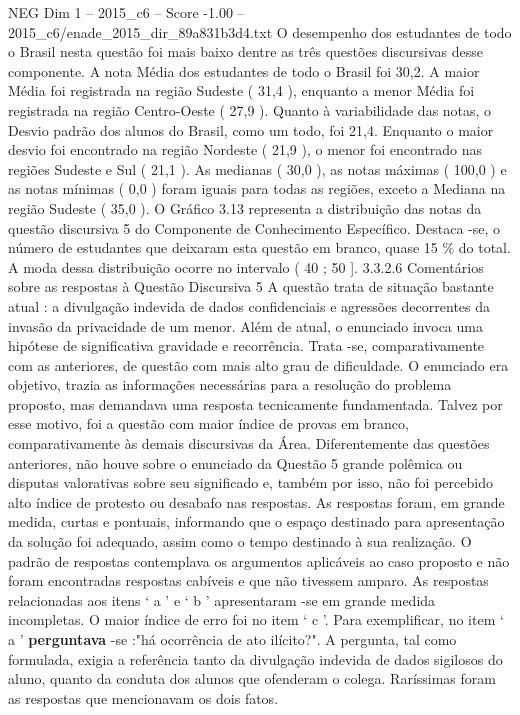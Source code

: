 \begin{textsample}{NEG Dim 1 – 2015\_c6 – Score -1.00 – 2015\_c6/enade\_2015\_dir\_89a831b3d4.txt}
O desempenho dos estudantes de todo o Brasil nesta questão foi mais baixo dentre as três questões discursivas desse componente.
A nota Média dos estudantes de todo o Brasil foi 30,2.
A maior Média foi registrada na região Sudeste ( 31,4 ), enquanto a menor Média foi registrada na região Centro-Oeste ( 27,9 ).
Quanto à variabilidade das notas, o Desvio padrão dos alunos do Brasil, como um todo, foi 21,4.
Enquanto o maior desvio foi encontrado na região Nordeste ( 21,9 ), o menor foi encontrado nas regiões Sudeste e Sul ( 21,1 ).
As medianas ( 30,0 ), as notas máximas ( 100,0 ) e as notas mínimas ( 0,0 ) foram iguais para todas as regiões, exceto a Mediana na região Sudeste ( 35,0 ).
O Gráfico 3.13 representa a distribuição das notas da questão discursiva 5 do Componente de Conhecimento Específico.
Destaca -se, o número de estudantes que deixaram esta questão em branco, quase 15 \% do total.
A moda dessa distribuição ocorre no intervalo ( 40 ; 50 ]. 3.3.2.6 Comentários sobre as respostas à Questão Discursiva 5 A questão trata de situação bastante atual : a divulgação indevida de dados confidenciais e agressões decorrentes da invasão da privacidade de um menor.
Além de atual, o enunciado invoca uma hipótese de significativa gravidade e recorrência.
Trata -se, comparativamente com as anteriores, de questão com mais alto grau de dificuldade.
O enunciado era objetivo, trazia as informações necessárias para a resolução do problema proposto, mas demandava uma resposta tecnicamente fundamentada.
Talvez por esse motivo, foi a questão com maior índice de provas em branco, comparativamente às demais discursivas da Área.
Diferentemente das questões anteriores, não houve sobre o enunciado da Questão 5 grande polêmica ou disputas valorativas sobre seu significado e, também por isso, não foi percebido alto índice de protesto ou desabafo nas respostas.
As respostas foram, em grande medida, curtas e pontuais, informando que o espaço destinado para apresentação da solução foi adequado, assim como o tempo destinado à sua realização.
O padrão de respostas contemplava os argumentos aplicáveis ao caso proposto e não foram encontradas respostas cabíveis e que não tivessem amparo.
As respostas relacionadas aos itens ‘ a ’ e ‘ b ’ apresentaram -se em grande medida incompletas.
O maior índice de erro foi no item ‘ c ’.
Para exemplificar, no item ‘ a ’ \textbf{perguntava} -se :"há ocorrência de ato ilícito?".
A pergunta, tal como formulada, exigia a referência tanto da divulgação indevida de dados sigilosos do aluno, quanto da conduta dos alunos que ofenderam o colega.
Raríssimas foram as respostas que mencionavam os dois fatos.

\end{textsample}

